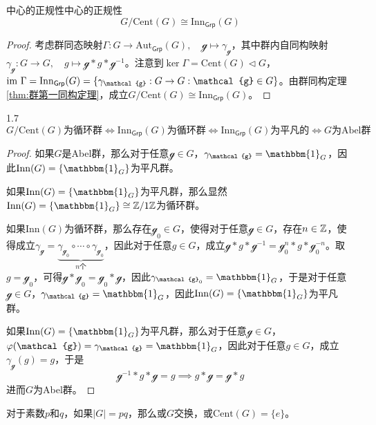 \begin{proposition}{中心的正规性}{中心的正规性}
	$$
	G/\mathrm{Cent}(G)\cong \mathrm{Inn}_{\mathsf{Grp}}(G)
	$$	
\end{proposition}

\begin{proof}
	考虑群同态映射$\Gamma:G\to \mathrm{Aut}_{\mathsf{Grp}}(G),\quad \mathcal{g}\mapsto \gamma_{\mathcal{g}}$，其中群内自同构映射$\gamma_{\mathcal{g}}:G\to G,\quad g\mapsto \mathcal{g}* g *\mathcal{g}^{-1}$。注意到$\ker \Gamma=\mathrm{Cent}(G)\lhd G$，$\im \Gamma=\mathrm{Inn}_{\mathsf{Grp}}(G)=\{ \gamma_\mathcal{g}:G\to G:\mathcal{g}\in G \}$。由群同构定理\ref{thm:群第一同构定理}，成立$G/\mathrm{Cent}(G)\cong \mathrm{Inn}_{\mathsf{Grp}}(G)$。
\end{proof}

\begin{proposition}{}{1.7}
	$$
	G/\mathrm{Cent}(G)\text{为循环群}\iff
	\mathrm{Inn}_{\mathsf{Grp}}(G)\text{为循环群}\iff
	\mathrm{Inn}_{\mathsf{Grp}}(G)\text{为平凡的}\iff
	G\text{为Abel群}
	$$
\end{proposition}

\begin{proof}
	如果$G$是Abel群，那么对于任意$\mathcal{g}\in G$，$\gamma_\mathcal{g}=\mathbbm{1}_G$，因此$\mathrm{Inn}(G)=\{ \mathbbm{1}_G \}$为平凡群。
	
	如果$\mathrm{Inn}(G)=\{ \mathbbm{1}_G \}$为平凡群，那么显然$\mathrm{Inn}(G)=\{ \mathbbm{1}_G \}\cong\Z/1\Z$为循环群。
	
	如果$\mathrm{Inn}(G)$为循环群，那么存在$\mathcal{g}_0\in G$，使得对于任意$\mathcal{g}\in G$，存在$n\in\mathbb{Z}$，使得成立$\gamma_\mathcal{g}=\underbrace{\gamma_{\mathcal{g}_0}\circ\cdots\circ\gamma_{\mathcal{g}_0}}_{n\text{个}}$，因此对于任意$g\in G$，成立$\mathcal{g}*g*\mathcal{g}^{-1}=\mathcal{g}_0^n*g*\mathcal{g}_0^{-n}$。取$g=\mathcal{g}_0$，可得$\mathcal{g}*\mathcal{g}_0=\mathcal{g}_0*\mathcal{g}$，因此$\gamma_{\mathcal{g}_0}=\mathbbm{1}_G$，于是对于任意$\mathcal{g}\in G$，$\gamma_{\mathcal{g}}=\mathbbm{1}_G$，因此$\mathrm{Inn}(G)=\{ \mathbbm{1}_G \}$为平凡群。
	
	如果$\mathrm{Inn}(G)=\{ \mathbbm{1}_G \}$为平凡群，那么对于任意$\mathcal{g}\in G$，$\varphi(\mathcal{g})=\gamma_{\mathcal{g}}=\mathbbm{1}_G$，因此对于任意$g\in G$，成立$\gamma_{\mathcal{g}}(g)=g$，于是
	$$
	\mathcal{g}^{-1}*g*\mathcal{g}=g\implies g*\mathcal{g}=\mathcal{g}*g
	$$
	进而$G$为Abel群。
\end{proof}

\begin{proposition}
	对于素数$p$和$q$，如果$|G|=pq$，那么或$G$交换，或$\mathrm{Cent}(G)=\{e\}$。
\end{proposition}

